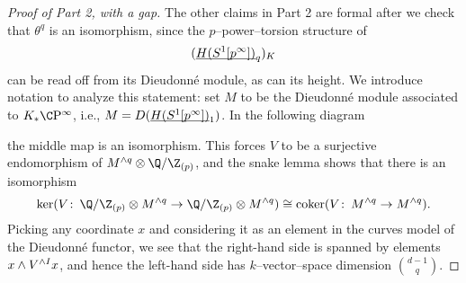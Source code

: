 \begin{proof}[Proof of Part 2, with a gap]\renewcommand{\qedsymbol}{\relax}
The other claims in Part 2 are formal after we check that \(\theta^q\) is an isomorphism, since the \(p\)--power--torsion structure of \[(\OS{H(S^1[p^\infty])}{q})_K\] can be read off from its Dieudonn\'e module, as can its height.  We introduce notation to analyze this statement: set \(M\) to be the Dieudonn\'e module associated to \(K_* \CP^\infty\), i.e., \(M = D(\OS{H(S^1[p^\infty])}{1})\).  In the following diagram
\begin{center}
\end{center}
the middle map is an isomorphism.  This forces \(V\) to be a surjective endomorphism of \(M^{\wedge q} \otimes \Q/\Z_{(p)}\), and the snake lemma shows that there is an isomorphism \[\ker(V\co \Q/\Z_{(p)} \otimes M^{\wedge q} \to \Q/\Z_{(p)} \otimes M^{\wedge q}) \cong \operatorname{coker}(V\co M^{\wedge q} \to M^{\wedge q}).\]  Picking any coordinate \(x\) and considering it as an element in the curves model of the Dieudonn\'e functor, we see that the right-hand side is spanned by elements \(x \wedge V^{\wedge I} x\), and hence the left-hand side has \(k\)--vector--space dimension \(\binom{d-1}{q}\).


\end{proof}
